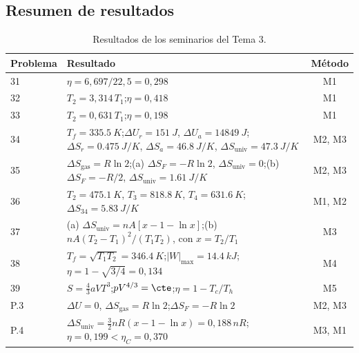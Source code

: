 \subsection{Resumen de resultados}
\begin{table}[H]
\centering
\caption{Resultados de los seminarios del Tema 3.}
\small
\renewcommand{\arraystretch}{1.35}
\begin{tabularx}{\textwidth}{lXc}
\toprule
Problema & Resultado & Método\\
\midrule
31 & $\eta=6{,}697/22{,}5=0{,}298$ & M1\\
32 & $T_2=3{,}314\,T_1$;\enspace $\eta=0{,}418$ & M1\\
33 & $T_2=0{,}631\,T_1$;\enspace $\eta=0{,}198$ & M1\\
34 & $T_f=\SI{335,5}{K}$;\enspace $\Delta U_r=\SI{151}{J}$, $\Delta U_a=\SI{14849}{J}$;\enspace $\Delta S_r=\SI{0,475}{J/K}$, $\Delta S_a=\SI{46,8}{J/K}$, $\Delta S_{\mathrm{univ}}=\SI{47,3}{J/K}$ & M2, M3\\
35 & $\Delta S_{\mathrm{gas}}=R\ln2$;\enspace (a) $\Delta S_F=-R\ln2$, $\Delta S_{\mathrm{univ}}=0$;\enspace (b) $\Delta S_F=-R/2$, $\Delta S_{\mathrm{univ}}=\SI{1,61}{J/K}$ & M2, M3\\
36 & $T_2=\SI{475,1}{K}$, $T_3=\SI{818,8}{K}$, $T_4=\SI{631,6}{K}$;\enspace $\Delta S_{34}=\SI{5,83}{J/K}$ & M1, M2\\
37 & (a) $\Delta S_{\mathrm{univ}}=nA[x-1-\ln x]$;\enspace (b) $nA(T_2-T_1)^2/(T_1T_2)$, con $x=T_2/T_1$ & M3\\
38 & $T_f=\sqrt{T_1T_2}=\SI{346,4}{K}$;\enspace $|W|_{\max}=\SI{14,4}{kJ}$;\enspace $\eta=1-\sqrt{3/4}=0{,}134$ & M4\\
39 & $S=\tfrac43aVT^3$;\enspace $pV^{4/3}=\cte$;\enspace $\eta=1-T_c/T_h$ & M5\\
P.3 & $\Delta U=0$, $\Delta S_{\mathrm{gas}}=R\ln2$;\enspace $\Delta S_F=-R\ln2$ & M2, M3\\
P.4 & $\Delta S_{\mathrm{univ}}=\tfrac32nR(x-1-\ln x)=0{,}188\,nR$;\enspace $\eta=0{,}199<\eta_C=0{,}370$ & M3, M1\\
\bottomrule
\end{tabularx}
\end{table}

